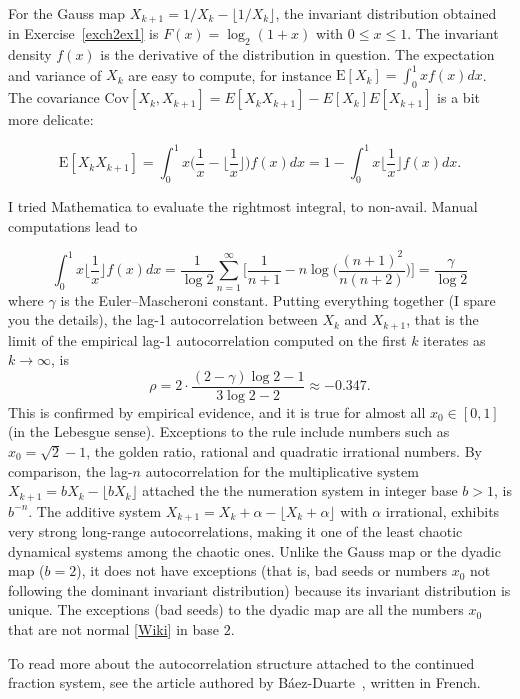 \documentclass[oneside,10pt]{book}
\begin{document}
For the Gauss map $X_{k+1}=1/X_k-\lfloor 1/X_k\rfloor$, the invariant distribution obtained in Exercise~\ref{exch2ex1} is $F(x)=\log_2(1+x)$ with $0\leq x \leq 1$. The invariant density $f(x)$ is the derivative of the distribution in question.  The expectation and variance of $X_k$ are easy to compute, for instance $\text{E}[X_k]=\int_0^1 x f(x)dx$. The
covariance $\text{Cov}[X_k,X_{k+1}]=E[X_k X_{k+1}]-E[X_k]E[X_{k+1}]$ is a bit more delicate:

$$\text{E}[X_k X_{k+1}]=\int_0^1 x\Bigg(\frac{1}{x}-\Bigg\lfloor\frac{1}{x}\Bigg\rfloor\Bigg)f(x)dx=1-\int_0^1 x\Bigg\lfloor\frac{1}{x}\Bigg\rfloor f(x)dx.$$

\noindent I tried Mathematica to evaluate the rightmost integral, to non-avail. Manual computations lead to

$$\int_0^1 x\Bigg\lfloor\frac{1}{x}\Bigg\rfloor f(x)dx =\frac{1}{\log 2}\sum_{n=1}^\infty \Bigg[\frac{1}{n+1}-n\log\Bigg(\frac{(n+1)^2}{n(n+2)}\Bigg)\Bigg] =\frac{\gamma}{\log 2} $$
where $\gamma$ is the Euler–Mascheroni constant. Putting everything together (I spare you the details), the lag-1 autocorrelation between $X_k$ and $X_{k+1}$, that is the limit of the empirical lag-1 autocorrelation computed on the first $k$ iterates as $k\rightarrow\infty$, is
\begin{equation}
\rho=2\cdot \frac{(2-\gamma)\log 2 - 1}{3\log 2 - 2} \approx -0.347. \label{fritesdur}
\end{equation}
This is confirmed by empirical evidence, and it is true for almost all $x_0\in [0, 1]$ (in the Lebesgue sense). Exceptions to the rule include numbers such as $x_0=\sqrt{2}-1$, the golden ratio, rational and quadratic irrational numbers. By comparison, the lag-$n$ autocorrelation for the multiplicative system $X_{k+1}=bX_k-\lfloor bX_k\rfloor$ attached the the numeration system in integer base $b>1$, is $b^{-n}$. The additive system $X_{k+1}=X_k+\alpha - \lfloor X_k +\alpha\rfloor$ with $\alpha$ irrational, exhibits very strong long-range autocorrelations, making it one of the least chaotic dynamical systems among the chaotic ones. Unlike the Gauss map or the dyadic map ($b=2$), it does not have exceptions (that is, bad seeds or numbers $x_0$ not following the dominant invariant distribution) because its invariant distribution is unique. The exceptions (bad seeds) to the dyadic map are all the numbers $x_0$ that are not \textcolor{index}{normal}
[\href{https://en.wikipedia.org/wiki/Normal_number}{Wiki}] in base $2$.

To read more about the autocorrelation structure attached to the continued fraction system, see the article authored by Báez-Duarte~\cite{autocorr2005}, written in French.
\end{document}

